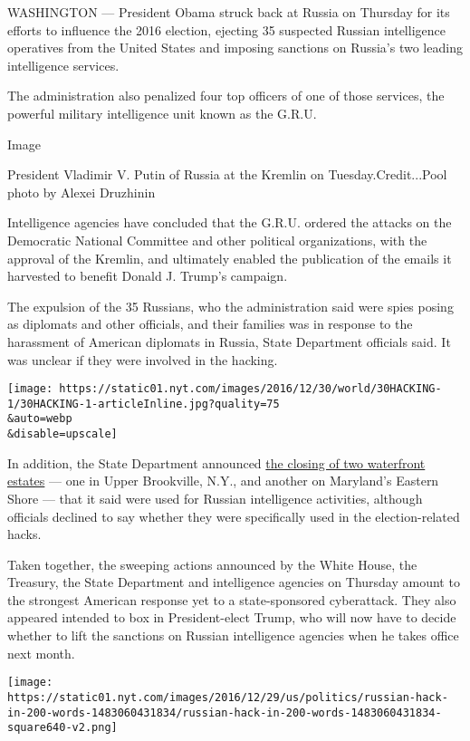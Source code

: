 WASHINGTON --- President Obama struck back at Russia on Thursday for its
efforts to influence the 2016 election, ejecting 35 suspected Russian
intelligence operatives from the United States and imposing sanctions on
Russia's two leading intelligence services.

The administration also penalized four top officers of one of those
services, the powerful military intelligence unit known as the G.R.U.

Image

President Vladimir V. Putin of Russia at the Kremlin on
Tuesday.Credit...Pool photo by Alexei Druzhinin

Intelligence agencies have concluded that the G.R.U. ordered the attacks
on the Democratic National Committee and other political organizations,
with the approval of the Kremlin, and ultimately enabled the publication
of the emails it harvested to benefit Donald J. Trump's campaign.

The expulsion of the 35 Russians, who the administration said were spies
posing as diplomats and other officials, and their families was in
response to the harassment of American diplomats in Russia, State
Department officials said. It was unclear if they were involved in the
hacking.

\texttt{[image: https://static01.nyt.com/images/2016/12/30/world/30HACKING-1/30HACKING-1-articleInline.jpg?quality=75\\\&auto=webp\\\&disable=upscale]}

In addition, the State Department announced
\href{https://www.nytimes.com/2016/12/29/us/politics/russia-spy-compounds-maryland-long-island.html}{the
closing of two waterfront estates} --- one in Upper Brookville, N.Y.,
and another on Maryland's Eastern Shore --- that it said were used for
Russian intelligence activities, although officials declined to say
whether they were specifically used in the election-related hacks.

Taken together, the sweeping actions announced by the White House, the
Treasury, the State Department and intelligence agencies on Thursday
amount to the strongest American response yet to a state-sponsored
cyberattack. They also appeared intended to box in President-elect
Trump, who will now have to decide whether to lift the sanctions on
Russian intelligence agencies when he takes office next month.

\href{https://www.nytimes.com/interactive/2016/12/29/us/politics/russian-hack-in-200-words.html}{}

\texttt{[image: https://static01.nyt.com/images/2016/12/29/us/politics/russian-hack-in-200-words-1483060431834/russian-hack-in-200-words-1483060431834-square640-v2.png]}

